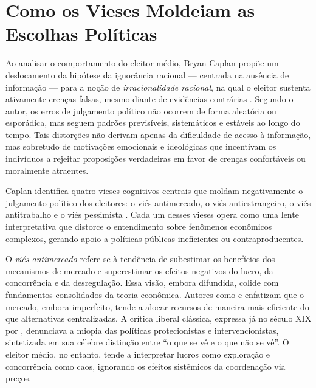 \section{Como os Vieses Moldeiam as Escolhas Políticas} %


Ao analisar o comportamento do eleitor médio, Bryan Caplan propõe um deslocamento da hipótese da ignorância racional — centrada na ausência de informação — para a noção de \textit{irracionalidade racional}, na qual o eleitor sustenta ativamente crenças falsas, mesmo diante de evidências contrárias \cite{The_Myth_of_the_Rational_Voter}. Segundo o autor, os erros de julgamento político não ocorrem de forma aleatória ou esporádica, mas seguem padrões previsíveis, sistemáticos e estáveis ao longo do tempo. Tais distorções não derivam apenas da dificuldade de acesso à informação, mas sobretudo de motivações emocionais e ideológicas que incentivam os indivíduos a rejeitar proposições verdadeiras em favor de crenças confortáveis ou moralmente atraentes.

Caplan identifica quatro vieses cognitivos centrais que moldam negativamente o julgamento político dos eleitores: o viés antimercado, o viés antiestrangeiro, o viés antitrabalho e o viés pessimista \cite{Systematically_Biased_Beliefs_about_Economics}. Cada um desses vieses opera como uma lente interpretativa que distorce o entendimento sobre fenômenos econômicos complexos, gerando apoio a políticas públicas ineficientes ou contraproducentes.

O \textit{viés antimercado} refere-se à tendência de subestimar os benefícios dos mecanismos de mercado e superestimar os efeitos negativos do lucro, da concorrência e da desregulação. Essa visão, embora difundida, colide com fundamentos consolidados da teoria econômica. Autores como  e  enfatizam que o mercado, embora imperfeito, tende a alocar recursos de maneira mais eficiente do que alternativas centralizadas. A crítica liberal clássica, expressa já no século XIX por , denunciava a miopia das políticas protecionistas e intervencionistas, sintetizada em sua célebre distinção entre ``o que se vê e o que não se vê''. O eleitor médio, no entanto, tende a interpretar lucros como exploração e concorrência como caos, ignorando os efeitos sistêmicos da coordenação via preços.

